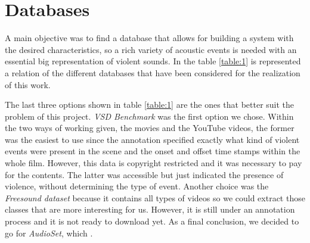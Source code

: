 \section{Databases}

	A main objective was to find a database that allows for building a system with the desired characteristics, so a rich variety of acoustic events is needed with an essential big representation of violent sounds. In the table \ref{table:1} is represented a relation of the different databases that have been considered for the realization of this work.
	
	
	
	The last three options shown in table \ref{table:1} are the ones that better suit the problem of this project. \textit{VSD Benchmark} was the first option we chose. Within the two ways of working given, the movies and the YouTube videos, the former was the easiest to use since the annotation specified exactly what kind of violent events were present in the scene and the onset and offset time stamps within the whole film. However, this data is copyright restricted and it was necessary to pay for the contents. The latter was accessible but just indicated the presence of violence, without determining the type of event. Another choice was the \textit{Freesound dataset} because it contains all types of videos so we could extract those classes that are more interesting for us. However, it is still under an annotation process and it is not ready to download yet. As a final conclusion, we decided to go for \textit{AudioSet}, which .
	
	
